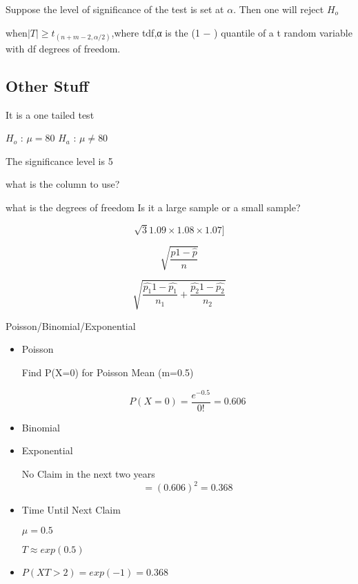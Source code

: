 Suppose the level of significance of the test is set at $\alpha$. Then one will reject $H_o$

when$|T| ≥ t_{(n+m−2,\alpha/2)}$,where tdf,α is the (1 − ) quantile of a t random variable with df degrees of
freedom.




\subsection{Other Stuff}

It is a one tailed test

$H_o$  : $\mu = 80 $
$H_a$  : $\mu \neq 80$ 

The significance level is 5%

what is the column to use?

what is the degrees of freedom 
Is it a large sample or a small sample?



\[\sqrt{3}{1.09 \times 1.08 \times 1.07}]\]


\[\sqrt{ \frac{\hat{p} 1- \hat{p}}{n} }\]


\[\sqrt{ \frac{\hat{p_1} 1- \hat{p_1}}{n_1} + \frac{\hat{p_2} 1- \hat{p_2}}{n_2}}\]





Poisson/Binomial/Exponential

\begin{itemize}
\item  Poisson

Find P(X=0) for Poisson Mean (m=0.5)


\[ P(X=0) = \frac{e^{-0.5}}{0!}  = 0.606 \]


\item Binomial




\item Exponential

No Claim in the next two years
\[= (0.606)^2 = 0.368\]


\item Time Until Next Claim

$\mu= 0.5$

$T \approx exp(0.5)$

\item$P(XT >2) = exp(-1) = 0.368$

\end{itemize}




